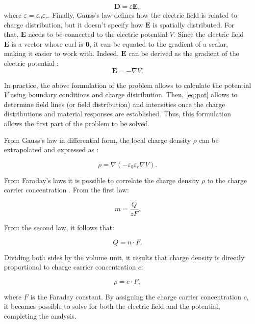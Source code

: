 \begin{equation}
    \label{eq:displ}
    \mathbf{D} = \varepsilon \mathbf{E} ,
\end{equation}
where $\varepsilon = \varepsilon_0 \varepsilon_r$.
Finally, Gauss’s law defines how the electric field is related to charge distribution, but it doesn't specify how $\mathbf{E}$ is spatially distributed. For that, $\mathbf{E}$ needs to be connected to the electric potential $V$. Since the electric field $\mathbf{E}$ is a vector whose curl is $\mathbf{0}$, it can be equated to the gradient of a scalar, making it easier to work with. Indeed, $\mathbf{E}$ can be derived as the gradient of the electric potential \citep{griffithsIntroduction2023}: %
\begin{equation}
    \label{eq:pot}
    \mathbf{E} = -\nabla V.
\end{equation}

In practice, the above formulation of the problem allows to calculate the potential $V$ using boundary conditions and charge distribution. Then, \eqref{eq:pot} allows to determine field lines (or field distribution) and intensities once the charge distributions and material responses are established. Thus, this formulation allows the first part of the problem to be solved.

\begin{remark}
From Gauss’s law in differential form, the local charge density $\rho$ can be extrapolated and expressed as \citep{griffithsIntroduction2023}: %

\begin{equation}
\rho = \nabla (-\varepsilon_0\varepsilon_r\nabla V).
\end{equation}

From Faraday's laws it is possible to correlate the charge density $\rho$ to the charge carrier concentration \citep{bardElectrochemical2022}. From the first law: %

\begin{equation}
m = \dfrac{Q}{zF}.
\end{equation}

From the second law, it follows that:

\begin{equation}
Q = n\cdot F.
\end{equation}

Dividing both sides by the volume unit, it results that charge density is directly proportional to charge carrier concentration $c$:

\begin{equation}
\rho = c\cdot F,
\end{equation}

where $F$ is the Faraday constant. By assigning the charge carrier concentration $c$, it becomes possible to solve for both the electric field and the potential, completing the analysis.
\end{remark}

